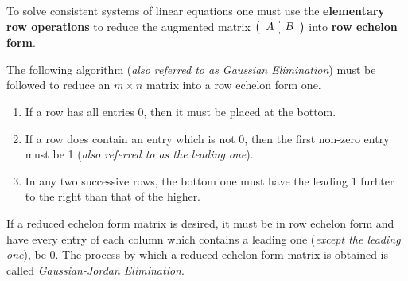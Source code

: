   

To solve consistent systems of linear equations one must use the \textbf{elementary row operations} to reduce the augmented matrix $\left(\begin{array}{c:c}A & B\end{array}\right)$ into \textbf{row echelon form}.

The following algorithm (\emph{also referred to as Gaussian Elimination}) must be followed to reduce an $m \times n $ matrix into a row echelon form one.

\begin{enumerate}
  \item If a row has all entries 0, then it must be placed at the bottom.
  \item If a row does contain an entry which is not 0, then the first non-zero entry must be 1 (\emph{also referred to as the leading one}).
  \item In any two successive rows, the bottom one must have the leading 1 furhter to the right than that of the higher.
\end{enumerate}

If a reduced echelon form matrix is desired, it must be in row echelon form and have every entry of each column which contains a leading one (\emph{except the leading one}), be 0. The process by which a reduced echelon form matrix is obtained is called \emph{Gaussian-Jordan Elimination}.
